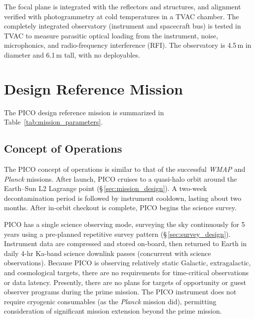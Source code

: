 The focal plane is integrated with the reflectors and structures, and alignment verified with photogrammetry at cold temperatures in a TVAC chamber.  The completely integrated observatory (instrument and spacecraft bus) is tested in TVAC to measure parasitic optical loading from the instrument, noise, microphonics, and radio-frequency interference (RFI). The observatory is 4.5\,m in diameter and 6.1\,m tall, with no deployables.

\section{Design Reference Mission}
\label{sec:design_reference} %
%

%
The PICO design reference mission is summarized in Table~\ref{tab:mission_parameters}.

\subsection{Concept of Operations}
\label{sec:operations} %

The PICO concept of operations is similar to that of the successful
\textit{WMAP} \citep{Bennett2003} and \textit{Planck} \citep{Tauber2010} missions. After launch,
PICO cruises to a quasi-halo orbit around the Earth--Sun L2 Lagrange point
(\S\,\ref{sec:mission_design}). A two-week decontamination period is followed by
instrument cooldown, lasting about two months. After in-orbit checkout is complete, PICO begins
the science survey.

PICO has a single science observing mode, surveying the sky
continuously for 5 years using a pre-planned repetitive survey pattern
(\S\,\ref{sec:survey_design}). Instrument data are compressed and stored on-board, then
returned to Earth in daily 4-hr Ka-band science downlink passes
(concurrent with science observations). Because PICO is observing
relatively static Galactic, extragalactic, and cosmological targets,
there are no requirements for time-critical observations or data
latency. Presently, there are no plans for targets of opportunity or
guest observer programs during the prime mission. The PICO instrument
does not require cryogenic consumables (as the \textit{Planck} mission did),
permitting consideration of significant mission extension beyond the prime
mission.

